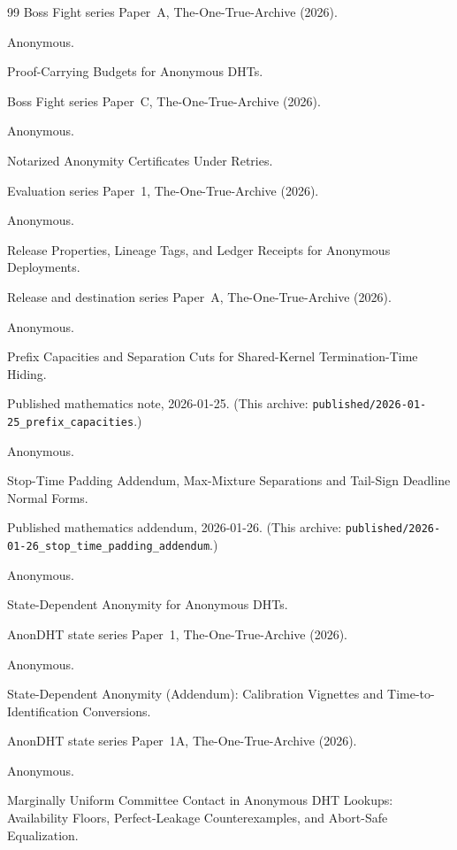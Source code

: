 \documentclass[11pt]{article}
\begin{document}
\begin{thebibliography}{99}
\newblock Boss Fight series Paper~A, The-One-True-Archive (2026).

Anonymous.

\newblock Proof-Carrying Budgets for Anonymous DHTs.

\newblock Boss Fight series Paper~C, The-One-True-Archive (2026).

Anonymous.

\newblock Notarized Anonymity Certificates Under Retries.

\newblock Evaluation series Paper~1, The-One-True-Archive (2026).

Anonymous.

\newblock Release Properties, Lineage Tags, and Ledger Receipts for Anonymous Deployments.

\newblock Release and destination series Paper~A, The-One-True-Archive (2026).


Anonymous.

\newblock Prefix Capacities and Separation Cuts for Shared-Kernel Termination-Time Hiding.

\newblock Published mathematics note, 2026-01-25. (This archive: \texttt{published/2026-01-25\_prefix\_capacities}.)

Anonymous.

\newblock Stop-Time Padding Addendum, Max-Mixture Separations and Tail-Sign Deadline Normal Forms.

\newblock Published mathematics addendum, 2026-01-26. (This archive: \texttt{published/2026-01-26\_stop\_time\_padding\_addendum}.)

Anonymous.

\newblock State-Dependent Anonymity for Anonymous DHTs.

\newblock AnonDHT state series Paper~1, The-One-True-Archive (2026).

Anonymous.

\newblock State-Dependent Anonymity (Addendum): Calibration Vignettes and Time-to-Identification Conversions.

\newblock AnonDHT state series Paper~1A, The-One-True-Archive (2026).

Anonymous.

\newblock Marginally Uniform Committee Contact in Anonymous DHT Lookups: Availability Floors, Perfect-Leakage Counterexamples, and Abort-Safe Equalization.


\end{thebibliography}
\end{document}
